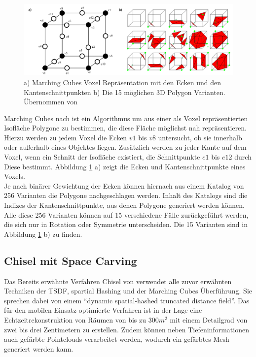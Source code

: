 \begin{figure}
  \centering
	\includegraphics[width=1.0\textwidth]{content/images/methods/marchingcubes.png} 
  \caption{a) Marching Cubes Voxel Repräsentation mit den Ecken und den Kantenschnittpunkten b) Die 15 möglichen 3D Polygon Varianten. Übernommen von \citet{MarchingCubes:online}}
  \label{fig:marchingcubes}
\end{figure}

Marching Cubes nach \citet{lorensen1987marching} ist ein Algorithmus um aus einer als Voxel repräsentierten Isofläche Polygone zu bestimmen, die diese Fläche möglichst nah repräsentieren. Hierzu werden zu jedem Voxel die Ecken \(v1\) bis \(v8\) untersucht, ob sie innerhalb oder außerhalb eines Objektes liegen. Zusätzlich werden zu jeder Kante auf dem Voxel, wenn ein Schnitt der Isofläche existiert, die Schnittpunkte \(e1\) bis \(e12\) durch Diese bestimmt. Abbildung \ref{fig:marchingcubes} a) zeigt die Ecken und Kantenschnittpunkte eines Voxels. \\

Je nach binärer Gewichtung der Ecken können hiernach aus einem Katalog von 256 Varianten die Polygone nachgeschlagen werden. Inhalt des Katalogs sind die Indizes der Kantenschnittpunkte, aus denen Polygone generiert werden können. Alle diese 256 Varianten können auf 15 verschiedene Fälle zurückgeführt werden, die sich nur in Rotation oder Symmetrie unterscheiden. Die 15 Varianten sind in Abbildung \ref{fig:marchingcubes} b) zu finden. \citep{MarchingCubes:online} \\

\subsection{Chisel mit Space Carving}

Das Bereits erwähnte Verfahren Chisel von \citet{Klingensmith_2015_7924} verwendet alle zuvor erwähnten Techniken der TSDF, spartial Hashing und der Marching Cubes Überführung. Sie sprechen dabei von einem \enquote{dynamic spatial-hashed truncated distance field}. Das für den mobilen Einsatz optimierte Verfahren ist in der Lage eine Echtzeitrekonstruktion von Räumen von bis zu \(300 m^2\) mit einem Detailgrad von zwei bis drei Zentimetern zu erstellen. Zudem können neben Tiefeninformationen auch gefärbte Pointclouds verarbeitet werden, wodurch ein gefärbtes Mesh generiert werden kann. \citep{Klingensmith_2015_7924}\\

